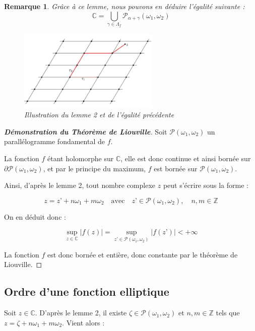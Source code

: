 \documentclass[12pt]{article}
\newtheorem{remark}{Remarque}
\begin{document}
\begin{remark}
    Grâce à ce lemme, nous pouvons en déduire l’égalité suivante :
\[
\mathbb{C} = \bigcup_{\gamma \in \Lambda_{f}} \mathcal{P}_{\alpha + \gamma} (\omega_1, \omega_2)
\]

\begin{figure}[h]
\centering
\includegraphics[width=0.6\textwidth]{lemme.jpeg}
\caption{Illustration du \textit{lemme} 2 et de l’\textit{égalité} précédente}
\end{figure}
\end{remark}

\begin{proof}[\textbf{Démonstration du Théorème de Liouville}]
Soit $\mathcal{P}(\omega_1, \omega_2)$ un parallélogramme fondamental de $f$.

La fonction $f$ étant holomorphe sur $\mathbb{C}$, elle est donc continue et ainsi bornée sur $\partial \mathcal{P}(\omega_1, \omega_2)$, et par le principe du maximum, $f$ est bornée sur $\mathcal{P}(\omega_1, \omega_2)$.

Ainsi, d’après le lemme 2, tout nombre complexe $z$ peut s’écrire sous la forme :

\[ z = z’ + n \omega_1 + m \omega_2 \quad \text{avec} \quad z’ \in \mathcal{P}(\omega_1, \omega_2), \quad n, m \in \mathbb{Z} \]

On en déduit donc :

\[ \sup_{z \in \mathbb{C}} |f(z)| = \sup_{z’ \in \mathcal{P}(\omega_1, \omega_2)} |f(z’)| < +\infty \]

La fonction $f$ est donc bornée et entière, donc constante par le théorème de Liouville.
\end{proof}

\subsection{Ordre d’une fonction elliptique}

Soit $z \in \mathbb{C}$. D’après le lemme 2, il existe $\zeta \in \mathcal{P}(\omega_1, \omega_2)$ et $n, m \in \mathbb{Z}$ tels que $z = \zeta + n \omega_1 + m \omega_2$. Vient alors :
\end{document}
